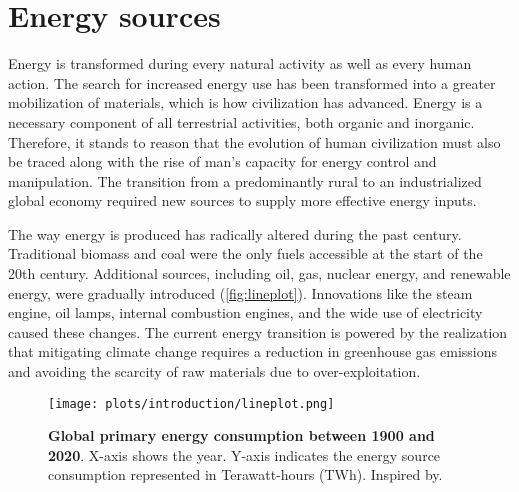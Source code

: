 
\section[Energy sources]{Energy sources}
\label{sec:energy_sources}

Energy is transformed during every natural activity as well as every human action. The search for increased energy use has been transformed into a greater mobilization of materials, which is how civilization has advanced. Energy is a necessary component of all terrestrial activities, both organic and inorganic. Therefore, it stands to reason that the evolution of human civilization must also be traced along with the rise of man's capacity for energy control and manipulation. The transition from a predominantly rural to an industrialized global economy required new sources to supply more effective energy inputs.\autocite{smil2000energy} 

The way energy is produced has radically altered during the past century. Traditional biomass and coal were the only fuels accessible at the start of the 20th century. Additional sources, including oil, gas, nuclear energy, and renewable energy, were gradually introduced\autocite{owidenergy} (\autoref{fig:lineplot}). Innovations like the steam engine, oil lamps, internal combustion engines, and the wide use of electricity caused these changes.\autocite{smil2017bp} The current energy transition is powered by the realization that mitigating climate change requires a reduction in greenhouse gas emissions and  avoiding the scarcity of raw materials due to over-exploitation.

\begin{figure}[ht!]
  \centering
  \texttt{[image: plots/introduction/lineplot.png]}
  \caption[ Global primary energy consumption between 1900 and 2020]{\textbf{ Global primary energy consumption between 1900 and 2020}. X-axis shows the year. Y-axis indicates the energy source consumption represented in Terawatt-hours (TWh). Inspired by.\autocite{owidenergy}}
  \label{fig:lineplot}
\end{figure}


